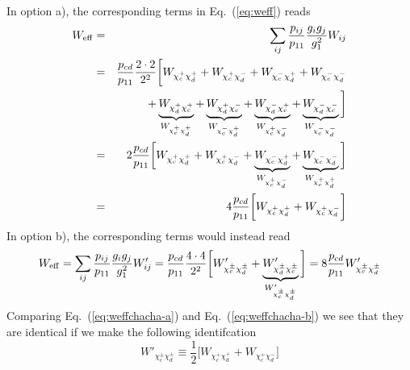 In option a), the corresponding terms in Eq.~(\ref{eq:weff}) reads
\begin{eqnarray}
    W_{\rm eff} & = & \sum_{ij}\frac{p_{ij}}{p_{11}} 
    \frac{g_{i}g_{j}}{g_{1}^2} W_{ij} \nonumber \\
    & = &
    \frac{p_{cd}}{p_{11}} \frac{2 \cdot 2}{2^2}
    \bigg[ 
    W_{\chi_{c}^+ \chi_{d}^+} +
    W_{\chi_{c}^+ \chi_{d}^-} +
    W_{\chi_{c}^- \chi_{d}^+} +
    W_{\chi_{c}^- \chi_{d}^-} \nonumber \\
    & & +
    \underbrace{W_{\chi_{d}^+ \chi_{c}^+}}_{W_{\chi_{c}^+ \chi_{d}^+}} +
    \underbrace{W_{\chi_{d}^+ \chi_{c}^-}}_{W_{\chi_{c}^- \chi_{d}^+}} +
    \underbrace{W_{\chi_{d}^- \chi_{c}^+}}_{W_{\chi_{c}^+ \chi_{d}^-}} +
    \underbrace{W_{\chi_{d}^- \chi_{c}^-}}_{W_{\chi_{c}^- \chi_{d}^-}}
    \bigg] \nonumber \\
    & = & 
    2 \frac{p_{cd}}{p_{11}}
    \bigg[
    W_{\chi_{c}^+ \chi_{d}^+} +
    W_{\chi_{c}^+ \chi_{d}^-} +
    \underbrace{W_{\chi_{c}^- \chi_{d}^+}}_{W_{\chi_{c}^+ \chi_{d}^-}} +
    \underbrace{W_{\chi_{c}^- \chi_{d}^-}}_{W_{\chi_{c}^+ \chi_{d}^+}}
    \bigg] \nonumber \\
    & = & 
    4 \frac{p_{cd}}{p_{11}}
    \bigg[
    W_{\chi_{c}^+ \chi_{d}^+} +
    W_{\chi_{c}^+ \chi_{d}^-}
    \bigg]
    \label{eq:weffchacha-a}
\end{eqnarray}
In option b), the corresponding terms would instead read
\begin{equation}
    W_{\rm eff} = \sum_{ij}\frac{p_{ij}}{p_{11}} 
    \frac{g_{i}g_{j}}{g_{1}^2} W'_{ij} =
    \frac{p_{cd}}{p_{11}} \frac{4 \cdot 4}{2^2}
    \bigg[ 
    W'_{\chi_{c}^\pm \chi_{d}^\pm} +
    \underbrace{W'_{\chi_{d}^\pm \chi_{c}^\pm}}_{W'_{\chi_{c}^\pm \chi_{d}^\pm}}
    \bigg]
     = 8 \frac{p_{cd}}{p_{11}} W'_{\chi_{c}^\pm \chi_{d}^\pm}
    \label{eq:weffchacha-b}
\end{equation}
Comparing Eq.~(\ref{eq:weffchacha-a}) and Eq.~(\ref{eq:weffchacha-b}) 
we see that they are identical if we make the following identifcation
\begin{equation}
    W'_{\chi_{c}^\pm \chi_{d}^\pm} \equiv \frac{1}{2} 
        \bigg[
    W_{\chi_{c}^+ \chi_{d}^+} +
    W_{\chi_{c}^+ \chi_{d}^-}
    \bigg]
\end{equation} 

